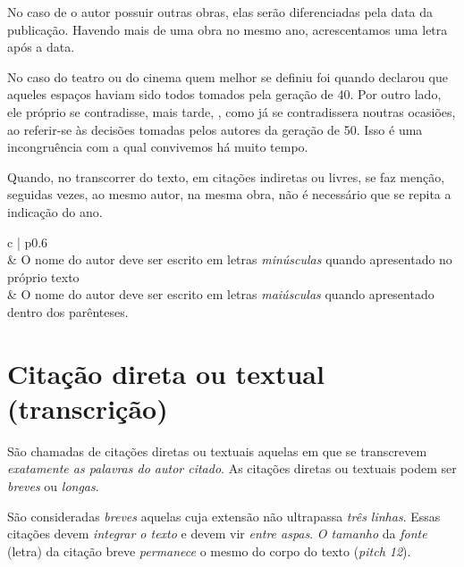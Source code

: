 No caso de o autor possuir outras obras, elas serão diferenciadas pela data da publicação. Havendo mais de uma obra no mesmo ano, acrescentamos uma letra após a data.

No caso do teatro ou do cinema quem melhor se definiu foi  quando declarou que aqueles espaços haviam sido todos tomados pela geração de 40. Por outro lado, ele próprio se contradisse, mais tarde, , como já se contradissera noutras ocasiões, ao referir-se às decisões tomadas pelos autores da geração de 50. Isso é uma incongruência com a qual convivemos há muito tempo.

Quando, no transcorrer do texto, em citações indiretas ou livres, se faz menção, seguidas vezes, ao mesmo autor, na mesma obra, não é necessário que se repita a indicação do ano.

\begin{table}[h]
    \caption{ Deve-se escolher somente um tipo de citação para usar durante o texto}
    \begin{center}
        \begin{tabular}{ c | p{} }
            \hline
             \\
            \hline
             & O nome do autor deve ser escrito em letras \emph{minúsculas} quando apresentado no próprio texto \\
            \hline
            \cite[p. 32]{guimaraes1985} & O nome do autor deve ser escrito em letras \emph{maiúsculas} quando apresentado dentro dos parênteses. \\
            \hline
        \end{tabular}
    \end{center}
    \label{tab:tipos-citacao}
\end{table}

\section{Citação direta ou textual (transcrição)}

São chamadas de citações diretas ou textuais aquelas em que se transcrevem \emph{exatamente as palavras do autor citado}. As citações diretas ou textuais podem ser \emph{breves} ou \emph{longas}.

São consideradas \emph{breves} aquelas cuja extensão não ultrapassa \emph{três linhas}. Essas citações devem \emph{integrar o texto} e devem vir \emph{entre aspas}. \emph{O tamanho} da \emph{fonte} (letra) da citação breve \emph{permanece} o mesmo do corpo do texto (\emph{pitch 12}).

